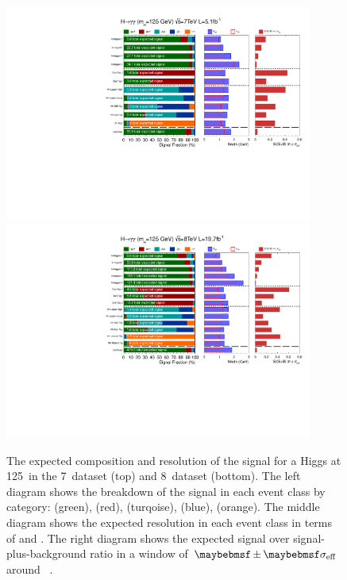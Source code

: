 
  
\begin{figure}
  \begin{center}
    \includegraphics[width=0.9\textwidth]{analysis/plots/ThesisFits/mva_7TeV/signalComposition_fix.pdf} \\
    \includegraphics[width=0.9\textwidth]{analysis/plots/ThesisFits/mva_8TeV/signalComposition_fix.pdf}
    \caption[The composition and width of the signal in each analysis category]{The expected composition and resolution of the signal for a \SM Higgs at 125~\GeV in the 7~\TeV dataset (top) and 8~\TeV dataset (bottom). The left diagram shows the breakdown of the signal in each event class by category: \ggH (green), \VBF (red), \WH (turqoise), \ZH (blue), \ttH (orange). The middle diagram shows the expected resolution in each event class in terms of \sigeff and \sigFW. The right diagram shows the expected signal over signal-plus-background ratio in a window of $\pm\sigeff$ around ~\GeV.}
    \label{fig:signal_composition}
  \end{center}
\end{figure}
  
